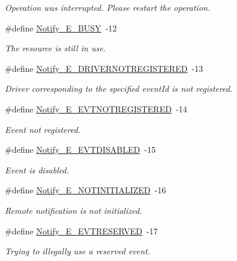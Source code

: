 \begin{DoxyCompactItemize}
\begin{DoxyCompactList}\small\item\em Operation was interrupted. Please restart the operation. \end{DoxyCompactList}\item 
\#define \hyperlink{_notify_8h_a21bc6c23823d736fb2589664d876d942}{Notify\-\_\-\-E\-\_\-\-B\-U\-S\-Y}~-\/12
\begin{DoxyCompactList}\small\item\em The resource is still in use. \end{DoxyCompactList}\item 
\#define \hyperlink{_notify_8h_a545952549555e51f9e79011dc809c07c}{Notify\-\_\-\-E\-\_\-\-D\-R\-I\-V\-E\-R\-N\-O\-T\-R\-E\-G\-I\-S\-T\-E\-R\-E\-D}~-\/13
\begin{DoxyCompactList}\small\item\em Driver corresponding to the specified event\-Id is not registered. \end{DoxyCompactList}\item 
\#define \hyperlink{_notify_8h_ad9030d9269afff260cba4971288ea06d}{Notify\-\_\-\-E\-\_\-\-E\-V\-T\-N\-O\-T\-R\-E\-G\-I\-S\-T\-E\-R\-E\-D}~-\/14
\begin{DoxyCompactList}\small\item\em Event not registered. \end{DoxyCompactList}\item 
\#define \hyperlink{_notify_8h_a5f7397fead455e8973aff576329edeec}{Notify\-\_\-\-E\-\_\-\-E\-V\-T\-D\-I\-S\-A\-B\-L\-E\-D}~-\/15
\begin{DoxyCompactList}\small\item\em Event is disabled. \end{DoxyCompactList}\item 
\#define \hyperlink{_notify_8h_a78efd69afedc82d2912adb9f668c2c54}{Notify\-\_\-\-E\-\_\-\-N\-O\-T\-I\-N\-I\-T\-I\-A\-L\-I\-Z\-E\-D}~-\/16
\begin{DoxyCompactList}\small\item\em Remote notification is not initialized. \end{DoxyCompactList}\item 
\#define \hyperlink{_notify_8h_a68460eb33839572c7416387b91e33e68}{Notify\-\_\-\-E\-\_\-\-E\-V\-T\-R\-E\-S\-E\-R\-V\-E\-D}~-\/17
\begin{DoxyCompactList}\small\item\em Trying to illegally use a reserved event. \end{DoxyCompactList}\item 

\end{DoxyCompactItemize}
